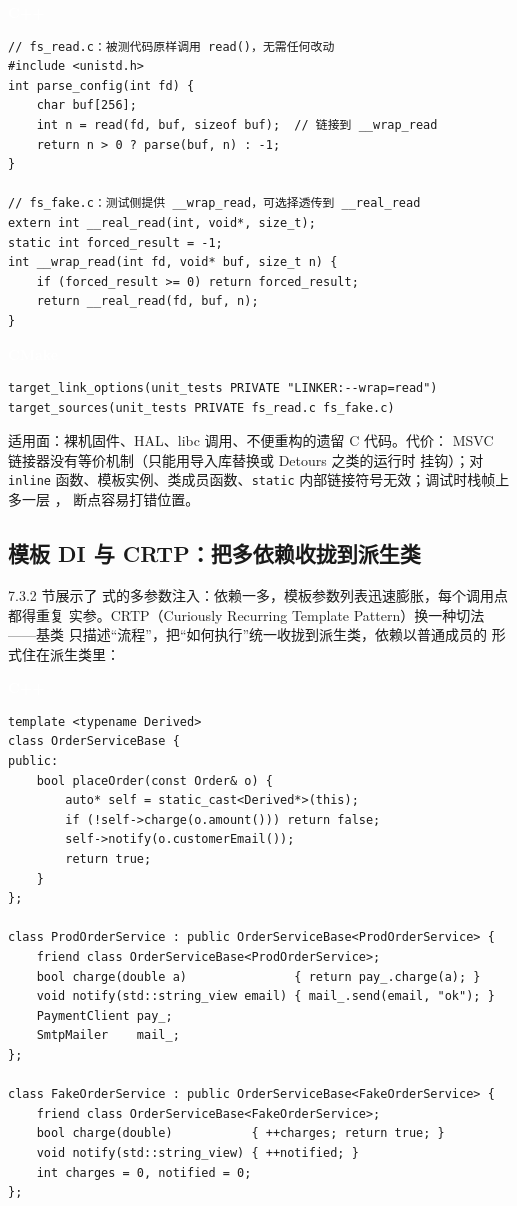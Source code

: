 \documentclass[12pt,a4paper,fontset=fandol]{ctexbook}
\newcommand{\cpplabel}{%
  \begin{tcolorbox}[enhanced,colback=cppheadbg,colframe=cppheadbg,
    arc=1mm,boxrule=0mm,left=6pt,right=6pt,top=2pt,bottom=2pt,
    halign=left,oversize]
    \textcolor{white}{\small\bfseries C++}
  \end{tcolorbox}\vspace{-4pt}}
\newcommand{\cmakelabel}{%
  \begin{tcolorbox}[enhanced,colback=cmakeheadbg,colframe=cmakeheadbg,
    arc=1mm,boxrule=0mm,left=6pt,right=6pt,top=2pt,bottom=2pt,
    halign=left,oversize]
    \textcolor{white}{\small\bfseries CMake}
  \end{tcolorbox}\vspace{-4pt}}
\begin{document}
\cpplabel
\begin{lstlisting}
// fs_read.c：被测代码原样调用 read()，无需任何改动
#include <unistd.h>
int parse_config(int fd) {
    char buf[256];
    int n = read(fd, buf, sizeof buf);  // 链接到 __wrap_read
    return n > 0 ? parse(buf, n) : -1;
}

// fs_fake.c：测试侧提供 __wrap_read，可选择透传到 __real_read
extern int __real_read(int, void*, size_t);
static int forced_result = -1;
int __wrap_read(int fd, void* buf, size_t n) {
    if (forced_result >= 0) return forced_result;
    return __real_read(fd, buf, n);
}
\end{lstlisting}

\cmakelabel
\begin{lstlisting}
target_link_options(unit_tests PRIVATE "LINKER:--wrap=read")
target_sources(unit_tests PRIVATE fs_read.c fs_fake.c)
\end{lstlisting}

适用面：裸机固件、HAL、libc 调用、不便重构的遗留 C 代码。代价：
MSVC 链接器没有等价机制（只能用导入库替换或 Detours 之类的运行时
挂钩）；对 \texttt{inline} 函数、模板实例、类成员函数、\texttt{static}
内部链接符号无效；调试时栈帧上多一层 ，
断点容易打错位置。

\subsection{模板 DI 与 CRTP：把多依赖收拢到派生类}

7.3.2 节展示了 
式的多参数注入：依赖一多，模板参数列表迅速膨胀，每个调用点都得重复
实参。CRTP（Curiously Recurring Template Pattern）换一种切法——基类
只描述“流程”，把“如何执行”统一收拢到派生类，依赖以普通成员的
形式住在派生类里：

\cpplabel
\begin{lstlisting}
template <typename Derived>
class OrderServiceBase {
public:
    bool placeOrder(const Order& o) {
        auto* self = static_cast<Derived*>(this);
        if (!self->charge(o.amount())) return false;
        self->notify(o.customerEmail());
        return true;
    }
};

class ProdOrderService : public OrderServiceBase<ProdOrderService> {
    friend class OrderServiceBase<ProdOrderService>;
    bool charge(double a)               { return pay_.charge(a); }
    void notify(std::string_view email) { mail_.send(email, "ok"); }
    PaymentClient pay_;
    SmtpMailer    mail_;
};

class FakeOrderService : public OrderServiceBase<FakeOrderService> {
    friend class OrderServiceBase<FakeOrderService>;
    bool charge(double)           { ++charges; return true; }
    void notify(std::string_view) { ++notified; }
    int charges = 0, notified = 0;
};
\end{lstlisting}
\end{document}
